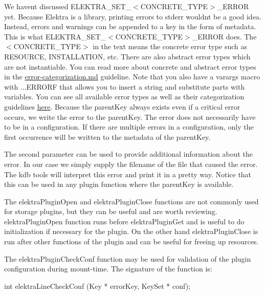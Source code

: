 We haven\textquotesingle{}t discussed {\ttfamily E\+L\+E\+K\+T\+R\+A\+\_\+\+S\+E\+T\+\_\+$<$C\+O\+N\+C\+R\+E\+T\+E\+\_\+\+T\+Y\+PE$>$\+\_\+\+E\+R\+R\+OR} yet. Because Elektra is a library, printing errors to stderr wouldn\textquotesingle{}t be a good idea. Instead, errors and warnings can be appended to a key in the form of metadata. This is what {\ttfamily E\+L\+E\+K\+T\+R\+A\+\_\+\+S\+E\+T\+\_\+$<$C\+O\+N\+C\+R\+E\+T\+E\+\_\+\+T\+Y\+PE$>$\+\_\+\+E\+R\+R\+OR} does. The {\ttfamily $<$C\+O\+N\+C\+R\+E\+T\+E\+\_\+\+T\+Y\+PE$>$} in the text means the concrete error type such as {\ttfamily R\+E\+S\+O\+U\+R\+CE}, {\ttfamily I\+N\+S\+T\+A\+L\+L\+A\+T\+I\+ON}, etc. There are also abstract error types which are not instantiable. You can read more about concrete and abstract error types in the \hyperlink{doc_dev_error-categorization_md}{error-\/categorization.md} guideline. Note that you also have a varargs macro with {\ttfamily ...E\+R\+R\+O\+RF} that allows you to insert a string and substitute parts with variables. You can see all available error types as well as their categorization guidelines \hyperlink{doc_dev_error-categorization_md}{here}. Because the parent\+Key always exists even if a critical error occurs, we write the error to the parent\+Key. The error does not necessarily have to be in a configuration. If there are multiple errors in a configuration, only the first occurrence will be written to the metadata of the {\ttfamily parent\+Key}.

The second parameter can be used to provide additional information about the error. In our case we simply supply the filename of the file that caused the error. The kdb tools will interpret this error and print it in a pretty way. Notice that this can be used in any plugin function where the parent\+Key is available.

The {\ttfamily elektra\+Plugin\+Open} and {\ttfamily elektra\+Plugin\+Close} functions are not commonly used for storage plugins, but they can be useful and are worth reviewing. {\ttfamily elektra\+Plugin\+Open} function runs before {\ttfamily elektra\+Plugin\+Get} and is useful to do initialization if necessary for the plugin. On the other hand {\ttfamily elektra\+Plugin\+Close} is run after other functions of the plugin and can be useful for freeing up resources.

The {\ttfamily elektra\+Plugin\+Check\+Conf} function may be used for validation of the plugin configuration during mount-\/time. The signature of the function is\+:


\begin{DoxyCode}
\textcolor{keywordtype}{int} elektraLineCheckConf (Key * errorKey, KeySet * conf);
\end{DoxyCode}


